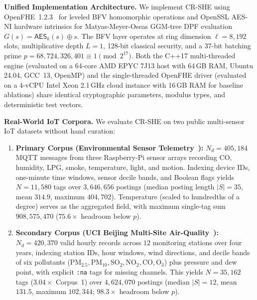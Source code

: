 \documentclass[11pt,a4paper]{article}
\begin{document}
\textbf{Unified Implementation Architecture.} We implement CR-SHE using OpenFHE~1.2.3~\cite{albadawi2022} for leveled BFV homomorphic operations and OpenSSL AES-NI hardware intrinsics for Matyas-Meyer-Oseas GGM-tree DPF evaluation $G(s) = \mathsf{AES}_k(s) \oplus s$. The BFV layer operates at ring dimension $\ell = 8{,}192$ slots, multiplicative depth $L = 1$, 128-bit classical security, and a 37-bit batching prime $p = 68{,}724{,}326{,}401 \equiv 1 \pmod{2^{17}}$. Both the C++17 multi-threaded engine (evaluated on a 64-core AMD EPYC 7J13 host with 64\,GB RAM, Ubuntu 24.04, GCC~13, OpenMP) and the single-threaded OpenFHE driver (evaluated on a 4-vCPU Intel Xeon 2.1\,GHz cloud instance with 16\,GB RAM for baseline ablations) share identical cryptographic parameters, modulus types, and deterministic test vectors.

\textbf{Real-World IoT Corpora.} We evaluate CR-SHE on two public multi-sensor IoT datasets without hand curation:
\begin{enumerate}\setlength{\itemsep}{2pt}\setlength{\parskip}{0pt}
    \item \textbf{Primary Corpus (Environmental Sensor Telemetry~\cite{stafford2020}):} $N_d = 405{,}184$ MQTT messages from three Raspberry-Pi sensor arrays recording CO, humidity, LPG, smoke, temperature, light, and motion. Indexing device IDs, one-minute time windows, sensor decile bands, and Boolean flags yields $N = 11{,}580$ tags over $3{,}646{,}656$ postings (median posting length $|S| = 35$, mean $314.9$, maximum $404{,}702$). Temperature (scaled to hundredths of a degree) serves as the aggregated field, with maximum single-tag sum $908{,}575{,}470$ ($75.6\times$ headroom below $p$).
    \item \textbf{Secondary Corpus (UCI Beijing Multi-Site Air-Quality~\cite{zhang2017,chen2019}):} $N_d = 420{,}370$ valid hourly records across $12$ monitoring stations over four years, indexing station IDs, hour windows, wind directions, and decile bands of six pollutants ($\text{PM}_{2.5}, \text{PM}_{10}, \text{SO}_2, \text{NO}_2, \text{CO}, \text{O}_3$) plus pressure and dew point, with explicit \texttt{:na} tags for missing channels. This yields $N = 35{,}162$ tags ($3.04\times$ Corpus~1) over $4{,}624{,}070$ postings (median $|S| = 12$, mean $131.5$, maximum $102{,}344$; $98.3\times$ headroom below $p$).
\end{enumerate}

\end{document}
